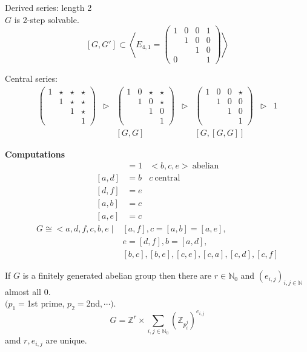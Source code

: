 \documentclass{article}
\let\ddd\cdots
\newcommand{\N}{\mathbb{N}}
\newcommand{\Z}{\mathbb{Z}}
\newcommand{\tsupgp}{\triangleright}
\theoremstyle{definition}
\theoremstyle{remark}
\theoremstyle{example}
\begin{document}
	Derived series: length 2\\
	$G$ is 2-step solvable.\\
	\[ [G,G'] \subset \left<E_{4,1} = \begin{pmatrix}
		1 & 0 & 0 & 1\\
		& 1 & 0 & 0 \\
		&& 1 & 0 \\
		0 &&& 1
	\end{pmatrix}\right> \]
	
	Central series:\[
	\begin{matrix}
		\begin{pmatrix}
		1 & \star & \star & \star\\
		& 1 & \star & \star\\
		&& 1 & \star \\
		&&& 1
		\end{pmatrix}&
		\tsupgp &
		\begin{pmatrix}
		1 & 0 & \star & \star\\
		& 1 & 0 & \star\\
		&& 1 & 0 \\
		&&& 1
		\end{pmatrix}& \tsupgp &
		\begin{pmatrix}
		1 & 0 & 0 & \star\\
		& 1 & 0 & 0\\
		&& 1 & 0 \\
		&&& 1
		\end{pmatrix}& 
		\tsupgp & 1\\
		&& [G,G] && [G,[G,G]]
	\end{matrix}
	\]
	
	\textbf{Computations}
	\begin{align*}
		[a,f] & = 1 & <b,c,e>\  \mathrm{abelian}\\
		[a,d] & = b & c\ \mathrm{central}\\
		[d,f] & = e\\
		[a,b] &= c\\
		[a,e] &= c
	\end{align*}
	\begin{align*}
		G \cong < a,d,f,c,b,e \mid & [a,f], c=[a,b]=[a,e],\\&e=[d,f],b=[a,d],
		\\&[b,c],[b,e],[c,e],[c,a],[c,d],[c,f]
	\end{align*}
	
	If $G$ is a finitely generated abelian group then there are $r \in \N_0$ and $(e_{i,j})_{i,j \in \N}$ almost all $0$.\\
	$(p_1=$1st prime, $p_2=$2nd$, \ddd)$.\\
	\[G=\Z^r \times \sum_{i,j \in \N_0} \left( \Z_{p_i^j} \right)^{e_{i,j}} \] amd $r,e_{i,j}$ are unique.
	
\end{document}
